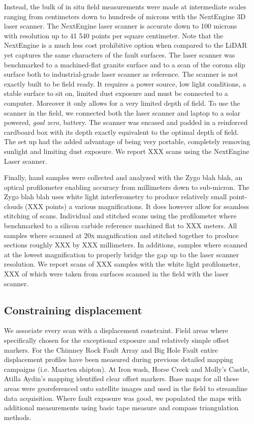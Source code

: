 \documentclass[12pt,a4paper]{article}
\begin{document}
Instead, the bulk of in situ field measurements were made at intermediate scales ranging from centimeters down to hundreds of microns with the NextEngine 3D laser scanner. The NextEngine laser scanner is accurate down to 100 microns with resolution up to 41 540 points per square centimeter. Note that the NextEngine is a much less cost prohibitive option when compared to the LiDAR yet captures the same characters of the fault surfaces. The laser scanner was benchmarked to a machined-flat granite surface and to a scan of the corona slip surface both to industrial-grade laser scanner as reference. The scanner is not exactly built to be field ready. It requires a power source, low light conditions, a stable surface to sit on, limited dust exposure and must be connected to a computer. Moreover it only allows for a very limited depth of field. To use the scanner in the field, we connected both the laser scanner and laptop to a solar powered, \textit{goal zero}, battery. The scanner was encased and padded in a reinforced cardboard box with its depth exactly equivalent to the optimal depth of field. The set up had the added advantage of being very portable, completely removing sunlight and limiting dust exposure. We report XXX scans using the NextEngine Laser scanner.

Finally, hand samples were collected and analyzed with the Zygo blah blah, an optical profilometer enabling accuracy from millimeters down to sub-micron. The Zygo blah blah uses white light interferometry to produce relatively small point-clouds (XXX points) a various magnifications. It does however allow for seamless stitching of scans. Individual and stitched scans using the profilometer where benchmarked to a silicon carbide reference machined flat to XXX meters. All samples where scanned at 20x magnification and stitched together to produce sections roughly XXX by XXX millimeters. In additions, samples where scanned at the lowest magnification to properly bridge the gap up to the laser scanner resolution. We report scans of XXX samples with the white light profilometer, XXX of which were taken from surfaces scanned in the field with the laser scanner.

	\subsection{Constraining displacement}

We associate every scan with a displacement constraint. Field areas where specifically chosen for the exceptional exposure and relatively simple offset markers. For the Chimney Rock Fault Array and Big Hole Fault entire displacement profiles have been measured during previous detailed mapping campaigns (i.e. Maarten  shipton). At Iron wash, Horse Creek and Molly’s Castle, Atilla Aydin’s mapping identified clear offset markers. Base maps for all these areas were georeferenced onto satellite images and used in the field to streamline data acquisition. Where fault exposure was good, we populated the maps with additional measurements using basic tape measure and compass triangulation methods. 
\end{document}
